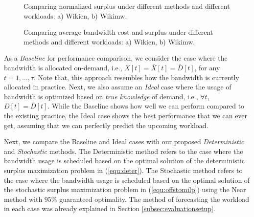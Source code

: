 \documentclass[10pt,journal,compsoc]{IEEEtran}
\begin{document}
\begin{figure}[!t]
\centering
{}
\caption{Comparing normalized surplus under different methods and different workloads: a) Wikien, b) Wikimw.\vspace{-0.2cm}}\label{fig:performance}
\end{figure}

\begin{figure}[!t]
\centering
{}
\caption{Comparing average bandwidth cost and surplus under different methods and different workloads: a) Wikien, b) Wikimw.\vspace{-0.2cm}}\label{fig:average}
\end{figure}
As a \emph{Baseline} for performance comparison, we consider the case where the bandwidth is allocated on-demand, i.e., $X[t]=\bar{X}[t]=\bar{D}[t]$, for any $t = 1, \ldots, \tau$. Note that, this approach resembles how the bandwidth is currently allocated in practice. Next, we also assume an \emph{Ideal} case where the usage of bandwidth is optimized based on \emph{true knowledge} of demand, i.e., $\forall t$, $D[t]=\bar{D}[t]$. While the Baseline shows how well we can perform compared to the existing practice, the Ideal case shows the best performance that we can ever get, assuming that we can perfectly predict the upcoming workload.




Next, we compare the Baseline and Ideal cases with our proposed \emph{Deterministic} and \emph{Stochastic} methods. The Deterministic method refers to the case where the bandwidth usage is scheduled based on the optimal solution of the deterministic surplus maximization problem in (\ref{equ:deter}). The Stochastic method refers to the case where the bandwidth usage is scheduled based on the optimal solution of the stochastic surplus maximization problem in (\ref{equ:offstomilp}) using the Near method with $95\%$ guaranteed optimality. The method of forecasting the workload in each case was already explained in Section \ref{subsec:evaluationsetup}.
\end{document}
